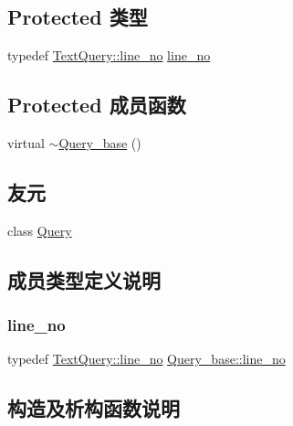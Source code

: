 \subsection*{Protected 类型}
\begin{DoxyCompactItemize}
\item 
typedef \hyperlink{classTextQuery_a504c1be8d67d4fcf4c205999e2377262}{Text\+Query\+::line\+\_\+no} \hyperlink{classQuery__base_a653b9dc8622a918b227c9f30dc636fba}{line\+\_\+no}
\end{DoxyCompactItemize}
\subsection*{Protected 成员函数}
\begin{DoxyCompactItemize}
\item 
virtual \hyperlink{classQuery__base_aa935ca8c8ea768ea3c5bd8d1df6f0c27}{$\sim$\+Query\+\_\+base} ()
\end{DoxyCompactItemize}
\subsection*{友元}
\begin{DoxyCompactItemize}
\item 
class \hyperlink{classQuery__base_a0de80064a367adf51ab09f7a9b6de05a}{Query}
\end{DoxyCompactItemize}


\subsection{成员类型定义说明}
\mbox{\label{classQuery__base_a653b9dc8622a918b227c9f30dc636fba}} 
\subsubsection{\texorpdfstring{line\+\_\+no}{line\_no}}
{\footnotesize\ttfamily typedef \hyperlink{classTextQuery_a504c1be8d67d4fcf4c205999e2377262}{Text\+Query\+::line\+\_\+no} \hyperlink{classQuery__base_a653b9dc8622a918b227c9f30dc636fba}{Query\+\_\+base\+::line\+\_\+no}\hspace{0.3cm}{\ttfamily [protected]}}



\subsection{构造及析构函数说明}
\mbox{\label{classQuery__base_aa935ca8c8ea768ea3c5bd8d1df6f0c27}} 
